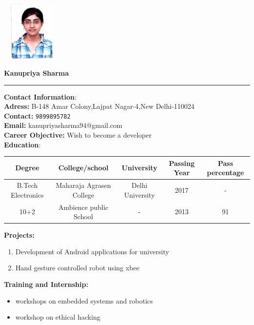 \documentclass[10pt,a4paper]{article}
\begin{document}
	
\begin{flushright}
\includegraphics[width=3cm, height=3cm]{Untitled}
\end{flushright}

\textbf{\huge \bigskip Kanupriya Sharma}
\hrule
\large
\begin{flushleft}
	
	\textbf{Contact Information}:\\
	\textbf{Adress:} B-148 Amar Colony,Lajpat Nagar-4,New Delhi-110024\\
	\textbf{Contact:} \texttt{9899895782}\\
	\textbf{Email:} kanupriyasharma94@gmail.com\\ 
	\textbf{Career Objective:}  Wish to become a  developer\\
	
	\textbf{\bigskip  Education}:\\
	
	\begin{tabular}{|c|c|c|c|c|}
		\hline \textbf{ Degree}  & \textbf{College/school}  & \textbf{University} & \textbf{Passing Year} & \textbf{ Pass percentage} \\ 
		\hline B.Tech Electronics & Maharaja Agrasen College  & Delhi University & 2017 & - \\ 
		\hline 
		10+2 & Ambience public School & - & 2013 & 91 \\
		\hline
		
	\end{tabular} 
	
	\bigskip
	
	\textbf{Projects:}\\
	\begin{enumerate}
		\item  Development of Android applications for university
		\item  Hand gesture controlled robot using xbee
	\end{enumerate}
	\textbf{Training and Internship:}\\
	\begin{itemize}
		\item  workshops on embedded systems and robotics\\
		\item  workshop on ethical hacking\\
	\end{itemize}
	

\end{flushleft}
\end{document}
